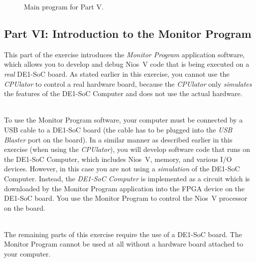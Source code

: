 \documentclass[epsfig,10pt,fullpage]{article}
\begin{document}
\begin{figure}[H]
\begin{center}

\end{center}
\caption{Main program for Part V.}
\label{fig:main2}
\end{figure}

\newpage
\subsection*{Part VI: Introduction to the Monitor Program}

\noindent
This part of the exercise introduces the {\it Monitor Program} application software, which 
allows you to develop and debug Nios~V code that is being executed on a
{\it real} DE1-SoC board. As stated earlier in this exercise, you cannot use the 
{\it CPUlator} to control a real hardware board, because the {\it CPUlator} only 
{\it simulates} the features of the DE1-SoC Computer and does not use the actual hardware.

~\\
\noindent
To use the Monitor Program software, your computer must be connected by a USB cable to a 
DE1-SoC board (the cable has to be plugged into the {\it USB Blaster} port on the board).
In a similar manner as described earlier in this exercise (when using the {\it CPUlator}), you 
will develop software code that runs on the DE1-SoC Computer, 
which includes Nios~V, memory, and various I/O devices.
However, in this case you are not using a {\it simulation} of the DE1-SoC Computer. Instead, 
the {\it DE1-SoC Computer} is implemented as a circuit which is downloaded by the Monitor
Program application into the FPGA device on the DE1-SoC board. You use the Monitor Program to 
control the Nios~V processor on the board.

~\\
\noindent
The remaining parts of this exercise require the use of a DE1-SoC board. The Monitor
Program cannot be used at all without a hardware board attached to your computer.
\end{document}
